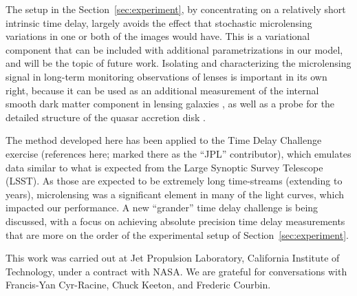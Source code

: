 \documentclass{emulateapj}
\begin{document}
The setup in the Section~\ref{sec:experiment}, by concentrating on a
relatively short intrinsic time delay, largely avoids the effect that
stochastic microlensing variations in one or both of the images would
have. This is a variational component that can be included with
additional parametrizations in our model, and will be the topic of
future work. Isolating and characterizing the microlensing signal in
long-term monitoring observations of lenses is important in its own
right, because it can be used as an additional measurement of the
internal smooth dark matter component in lensing galaxies
\citep{Schechter2002a}, as well as a probe for the detailed structure
of the quasar accretion disk \citep[e.g.][]{Morgan2010a}.

The method developed here has been applied to the Time Delay Challenge
exercise (references here; marked there as the ``JPL'' contributor),
which emulates data similar to what is expected from the Large
Synoptic Survey Telescope (LSST).  As those are expected to be
extremely long time-streams (extending to years), microlensing was a
significant element in many of the light curves, which impacted our 
performance. A new ``grander'' time delay challenge is being
discussed, with a focus on achieving absolute precision time delay
measurements that are more on the order of the experimental setup of
Section~\ref{sec:experiment}. 

\acknowledgements

This work was carried out at Jet Propulsion Laboratory, California
Institute of Technology, under a contract with NASA.  We are grateful
for conversations with Francis-Yan Cyr-Racine, Chuck Keeton, and
Frederic Courbin. 




\end{document}
